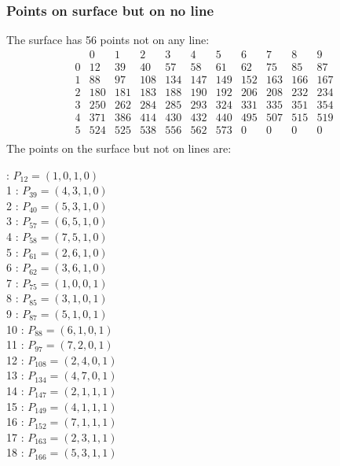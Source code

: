 \documentclass{article}
\begin{document}
{\subsubsection*{Points on surface but on no line}
The surface has 56 points not on any line:\\
$$
\begin{array}{r|*{10}{r}}
 & 0 & 1 & 2 & 3 & 4 & 5 & 6 & 7 & 8 & 9\\
\hline
0 & 12 & 39 & 40 & 57 & 58 & 61 & 62 & 75 & 85 & 87\\
1 & 88 & 97 & 108 & 134 & 147 & 149 & 152 & 163 & 166 & 167\\
2 & 180 & 181 & 183 & 188 & 190 & 192 & 206 & 208 & 232 & 234\\
3 & 250 & 262 & 284 & 285 & 293 & 324 & 331 & 335 & 351 & 354\\
4 & 371 & 386 & 414 & 430 & 432 & 440 & 495 & 507 & 515 & 519\\
5 & 524 & 525 & 538 & 556 & 562 & 573 & 0 & 0 & 0 & 0\\
\end{array}
$$
The points on the surface but not on lines are:\\
\begin{multicols}{2}
 : $P_{12}=( 1, 0, 1, 0 )$\\
1 : $P_{39}=( 4, 3, 1, 0 )$\\
2 : $P_{40}=( 5, 3, 1, 0 )$\\
3 : $P_{57}=( 6, 5, 1, 0 )$\\
4 : $P_{58}=( 7, 5, 1, 0 )$\\
5 : $P_{61}=( 2, 6, 1, 0 )$\\
6 : $P_{62}=( 3, 6, 1, 0 )$\\
7 : $P_{75}=( 1, 0, 0, 1 )$\\
8 : $P_{85}=( 3, 1, 0, 1 )$\\
9 : $P_{87}=( 5, 1, 0, 1 )$\\
10 : $P_{88}=( 6, 1, 0, 1 )$\\
11 : $P_{97}=( 7, 2, 0, 1 )$\\
12 : $P_{108}=( 2, 4, 0, 1 )$\\
13 : $P_{134}=( 4, 7, 0, 1 )$\\
14 : $P_{147}=( 2, 1, 1, 1 )$\\
15 : $P_{149}=( 4, 1, 1, 1 )$\\
16 : $P_{152}=( 7, 1, 1, 1 )$\\
17 : $P_{163}=( 2, 3, 1, 1 )$\\
18 : $P_{166}=( 5, 3, 1, 1 )$\\

\end{multicols}}
\end{document}
